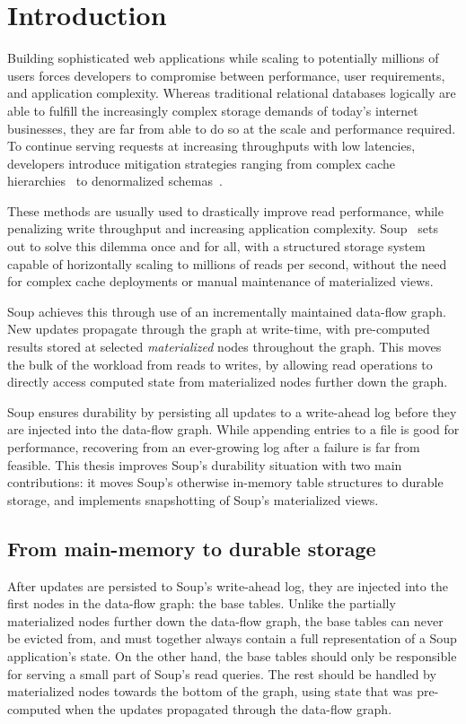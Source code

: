 \chapter{Introduction}

Building sophisticated web applications while scaling to potentially millions of
users forces developers to compromise between performance, user requirements,
and application complexity. Whereas traditional relational databases logically
are able to fulfill the increasingly complex storage demands of today's internet
businesses, they are far from able to do so at the scale and performance
required. To continue serving requests at increasing throughputs with low
latencies, developers introduce mitigation strategies ranging from complex cache
hierarchies~\cite{memcached} to denormalized schemas~\cite{denormalization}.

These methods are usually used to drastically improve read performance, while
penalizing write throughput and increasing application complexity.
Soup~\cite{xylem} sets out to solve this dilemma once and for all, with a
structured storage system capable of horizontally scaling to millions of reads
per second, without the need for complex cache deployments or manual maintenance
of materialized views.

Soup achieves this through use of an incrementally maintained data-flow graph.
New updates propagate through the graph at write-time, with pre-computed results
stored at selected \textit{materialized} nodes throughout the graph. This
moves the bulk of the workload from reads to writes, by allowing read operations
to directly access computed state from materialized nodes further down the
graph.

Soup ensures durability by persisting all updates to a write-ahead log before
they are injected into the data-flow graph. While appending entries to a file is
good for performance, recovering from an ever-growing log after a failure is far
from feasible. This thesis improves Soup's durability situation with two main
contributions: it moves Soup's otherwise in-memory table structures to durable
storage, and implements snapshotting of Soup's materialized views.

\newpage

\section{From main-memory to durable storage}

After updates are persisted to Soup's write-ahead log, they are injected into
the first nodes in the data-flow graph: the base tables. Unlike the partially
materialized nodes further down the data-flow graph, the base tables can never
be evicted from, and must together always contain a full representation of a
Soup application's state. On the other hand, the base tables should only be
responsible for serving a small part of Soup's read queries. The rest should be
handled by materialized nodes towards the bottom of the graph, using state that
was pre-computed when the updates propagated through the data-flow graph.

